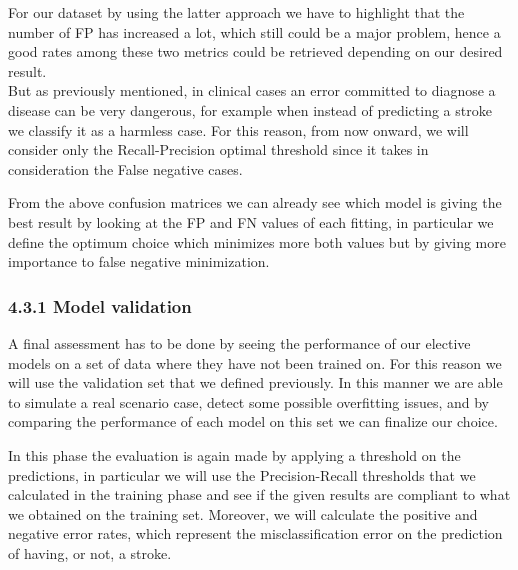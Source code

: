 \documentclass[
]{article}
\newenvironment{Shaded}{\begin{snugshade}}{\end{snugshade}}
\newcommand{\AttributeTok}[1]{\textcolor[rgb]{0.77,0.63,0.00}{#1}}
\newcommand{\CommentTok}[1]{\textcolor[rgb]{0.56,0.35,0.01}{\textit{#1}}}
\newcommand{\DecValTok}[1]{\textcolor[rgb]{0.00,0.00,0.81}{#1}}
\newcommand{\FunctionTok}[1]{\textcolor[rgb]{0.00,0.00,0.00}{#1}}
\newcommand{\NormalTok}[1]{#1}
\newcommand{\OtherTok}[1]{\textcolor[rgb]{0.56,0.35,0.01}{#1}}
\newcommand{\SpecialCharTok}[1]{\textcolor[rgb]{0.00,0.00,0.00}{#1}}
\newcommand{\StringTok}[1]{\textcolor[rgb]{0.31,0.60,0.02}{#1}}
\begin{document}
For our dataset by using the latter approach we have to highlight that
the number of FP has increased a lot, which still could be a major
problem, hence a good rates among these two metrics could be retrieved
depending on our desired result.\\
But as previously mentioned, in clinical cases an error committed to
diagnose a disease can be very dangerous, for example when instead of
predicting a stroke we classify it as a harmless case. For this reason,
from now onward, we will consider only the Recall-Precision optimal
threshold since it takes in consideration the False negative cases.

From the above confusion matrices we can already see which model is giving
the best result by looking at the FP and FN values of each fitting, in
particular we define the optimum choice which minimizes more both values
but by giving more importance to false negative minimization.

\hypertarget{model-validation}{%
\subsubsection{4.3.1 Model validation}\label{model-validation}}

A final assessment has to be done by seeing the performance of our
elective models on a set of data where they have not been trained on.
For this reason we will use the validation set that we defined
previously. In this manner we are able to simulate a real scenario case,
detect some possible overfitting issues, and by comparing the
performance of each model on this set we can finalize our choice.


In this phase the evaluation is again made by applying a threshold on
the predictions, in particular we will use the Precision-Recall
thresholds that we calculated in the training phase and see if the given
results are compliant to what we obtained on the training set. Moreover,
we will calculate the positive and negative error rates, which represent
the misclassification error on the prediction of having, or not, a
stroke.

\begin{Shaded}
\end{Shaded}
\end{document}
